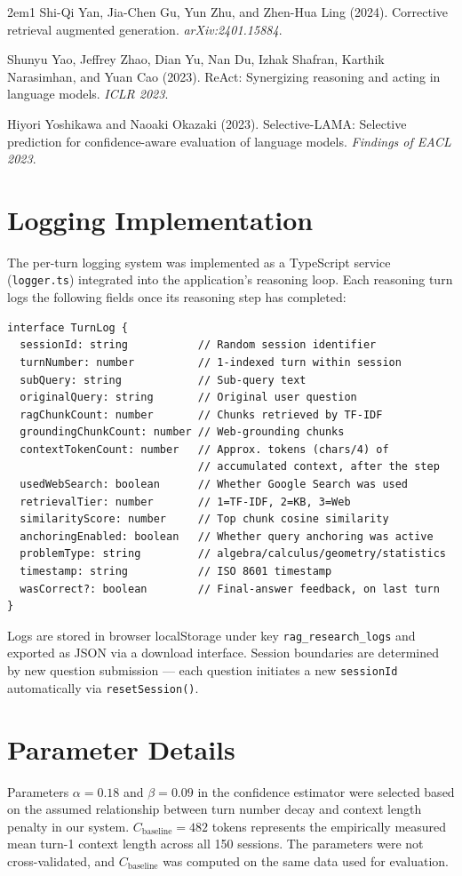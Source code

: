 \documentclass[11pt,a4paper]{article}
\begin{document}
\begin{hangparas}{2em}{1}
Shi-Qi Yan, Jia-Chen Gu, Yun Zhu, and Zhen-Hua Ling (2024). Corrective retrieval augmented generation.
    \textit{arXiv:2401.15884}.

Shunyu Yao, Jeffrey Zhao, Dian Yu, Nan Du, Izhak Shafran, Karthik Narasimhan, and Yuan Cao (2023). ReAct: Synergizing
    reasoning and acting in language models. \textit{ICLR 2023}.

Hiyori Yoshikawa and Naoaki Okazaki (2023). Selective-LAMA: Selective prediction for confidence-aware evaluation of
    language models. \textit{Findings of EACL 2023}.
\end{hangparas}

\appendix
\renewcommand{\thesection}{Appendix \Alph{section}}

\section{Logging Implementation}
The per-turn logging system was implemented as a TypeScript service (\texttt{logger.ts}) integrated into the
application's reasoning loop. Each reasoning turn logs the following fields once its reasoning step has completed:
\begin{verbatim}
interface TurnLog {
  sessionId: string           // Random session identifier
  turnNumber: number          // 1-indexed turn within session
  subQuery: string            // Sub-query text
  originalQuery: string       // Original user question
  ragChunkCount: number       // Chunks retrieved by TF-IDF
  groundingChunkCount: number // Web-grounding chunks
  contextTokenCount: number   // Approx. tokens (chars/4) of
                              // accumulated context, after the step
  usedWebSearch: boolean      // Whether Google Search was used
  retrievalTier: number       // 1=TF-IDF, 2=KB, 3=Web
  similarityScore: number     // Top chunk cosine similarity
  anchoringEnabled: boolean   // Whether query anchoring was active
  problemType: string         // algebra/calculus/geometry/statistics
  timestamp: string           // ISO 8601 timestamp
  wasCorrect?: boolean        // Final-answer feedback, on last turn
}
\end{verbatim}
Logs are stored in browser localStorage under key \texttt{rag\_research\_logs} and exported as JSON via a
download interface. Session boundaries are determined by new question submission --- each question initiates a
new \texttt{sessionId} automatically via \texttt{resetSession()}.

\section{Parameter Details}
Parameters $\alpha = 0.18$ and $\beta = 0.09$ in the confidence estimator were selected based on the assumed
relationship between turn number decay and context length penalty in our system. $C_{\mathrm{baseline}} = 482$
tokens represents the empirically measured mean turn-1 context length across all 150 sessions. The parameters
were not cross-validated, and $C_{\mathrm{baseline}}$ was computed on the same data used for evaluation.
\end{document}
